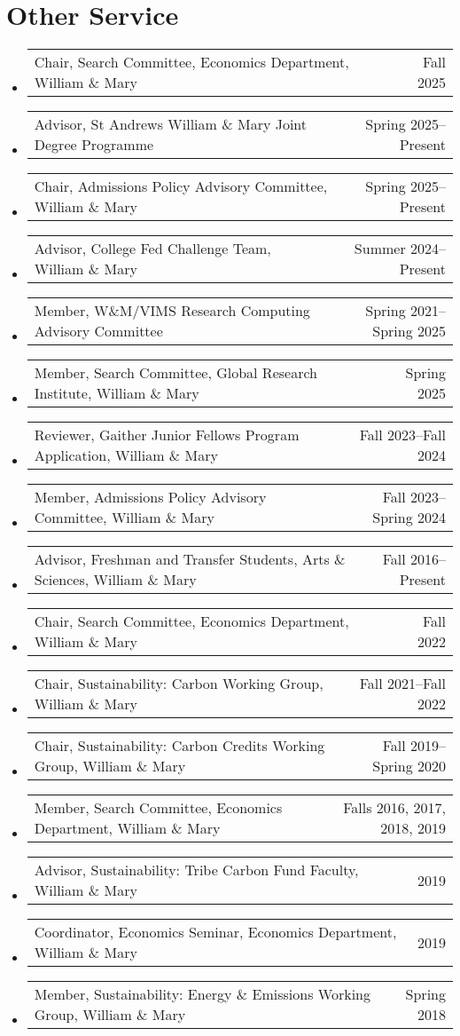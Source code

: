 \documentclass[10pt,letterpaper,en-US]{article}
\makeatletter
\newcommand{\itemrow}[2]
{\begin{tabular*}{\linewidth}{l@{\extracolsep{\fill}}r}
	#1 & #2 \\
\end{tabular*}}
\makeatother
\begin{document}
\section*{Other Service}
\begin{itemize}
    \item \itemrow{Chair, Search Committee, Economics Department, William \& Mary}{Fall 2025}
    \item \itemrow{Advisor, St Andrews William \& Mary Joint Degree Programme}{Spring 2025--Present}
    \item \itemrow{Chair, Admissions Policy Advisory Committee, William \& Mary}{Spring 2025--Present}
    \item \itemrow{Advisor, College Fed Challenge Team, William \& Mary}{Summer 2024--Present}
    \item \itemrow{Member, W\&M/VIMS Research Computing Advisory Committee}{Spring 2021--Spring 2025}
    \item \itemrow{Member, Search Committee, Global Research Institute, William \& Mary}{Spring 2025}
    \item \itemrow{Reviewer, Gaither Junior Fellows Program Application, William \& Mary}{Fall 2023--Fall 2024}
    \item \itemrow{Member, Admissions Policy Advisory Committee, William \& Mary}{Fall 2023--Spring 2024}
    \item \itemrow{Advisor, Freshman and Transfer Students, Arts \& Sciences, William \& Mary}{Fall 2016--Present}
    \item \itemrow{Chair, Search Committee, Economics Department, William \& Mary}{Fall 2022}
    \item \itemrow{Chair, Sustainability: Carbon Working Group, William \& Mary}{Fall 2021--Fall 2022}
    \item \itemrow{Chair, Sustainability: Carbon Credits Working Group, William \& Mary}{Fall 2019--Spring 2020}
    \item \itemrow{Member, Search Committee, Economics Department, William \& Mary}{Falls 2016, 2017, 2018, 2019}
    \item \itemrow{Advisor, Sustainability: Tribe Carbon Fund Faculty, William \& Mary}{2019}
    \item \itemrow{Coordinator, Economics Seminar, Economics Department, William \& Mary}{2019}
    \item \itemrow{Member, Sustainability: Energy \& Emissions Working Group, William \& Mary}{Spring 2018}
\end{itemize}
\end{document}
